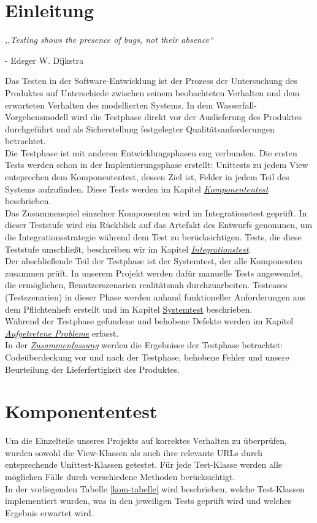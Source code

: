 \documentclass[parskip=full,11pt]{scrartcl}
\begin{document}
 \section{Einleitung}
\begin{center}
\textit{,,Testing shows the presence of bugs, not their absence``}
\end{center}
\begin{flushright}
- Edsger W. Dijkstra\\
\end{flushright}
Das Testen in der Software-Entwicklung ist der Prozess der Untersuchung des Produktes auf Unterschiede zwischen seinem beobachteten Verhalten und dem erwarteten Verhalten des modellierten Systems.
In dem Wasserfall-Vorgehensmodell wird die Testphase direkt vor der Auslieferung des Produktes durchgeführt und als Sicherstellung festgelegter Qualitätsanforderungen betrachtet.\\
Die Testphase ist mit anderen Entwicklungsphasen eng verbunden. Die ersten Tests werden schon in der Implentierungsphase erstellt: Unittests zu jedem View entsprechen dem Komponententest, dessen Ziel ist, Fehler in jedem Teil des Systems aufzufinden. Diese Tests werden im Kapitel \hyperref[komponententest]{\textit{Komponententest}} beschrieben.\\
Das Zusammenspiel einzelner Komponenten wird im Integrationstest geprüft. In dieser Teststufe wird ein Rückblick auf das Artefakt des Entwurfs genommen, um die Integrationsstrategie während dem Test zu berücksichtigen. Tests, die diese Teststufe umschlie{\ss}t, beschreiben wir im Kapitel \hyperref[integrationtest]{\textit{Integrationstest}}.\\
Der abschlie{\ss}ende Teil der Testphase ist der Systemtest, der alle Komponenten zusammen prüft. In unserem Projekt werden dafür manuelle Tests angewendet, die ermöglichen, Benutzerszenarien realitätsnah durchzuarbeiten. Testcases (Testszenarien) in dieser Phase werden anhand funktioneller Anforderungen aus dem Pflichtenheft erstellt und im Kapitel \hyperref[systemtest]{Systemtest} beschrieben.\\
Während der Testphase gefundene und behobene  Defekte werden im Kapitel \hyperref[bugs]{\textit{Aufgetretene Probleme}} erfasst.\\
In der \hyperref[zusammenfassung]{\textit{Zusammenfassung}} werden die Ergebnisse der Testphase betrachtet: Codeüberdeckung vor und nach der Testphase, behobene Fehler und unsere Beurteilung der Lieferfertigkeit des Produktes.
 \newpage
\section{Komponententest} \label{komponententest}
Um die Einzelteile unseres Projekts auf korrektes Verhalten zu überprüfen, wurden sowohl die View-Klassen als auch ihre relevante URLs durch entsprechende Unittest-Klassen getestet. Für jede Test-Klasse werden alle möglichen Fälle durch verschiedene Methoden berücksichtigt.\\
In der vorliegenden Tabelle \ref{kom-tabelle} wird beschrieben, welche Test-Klassen implementiert wurden, was in den jeweiligen Tests geprüft wird und welches Ergebnis erwartet wird.
\end{document}
